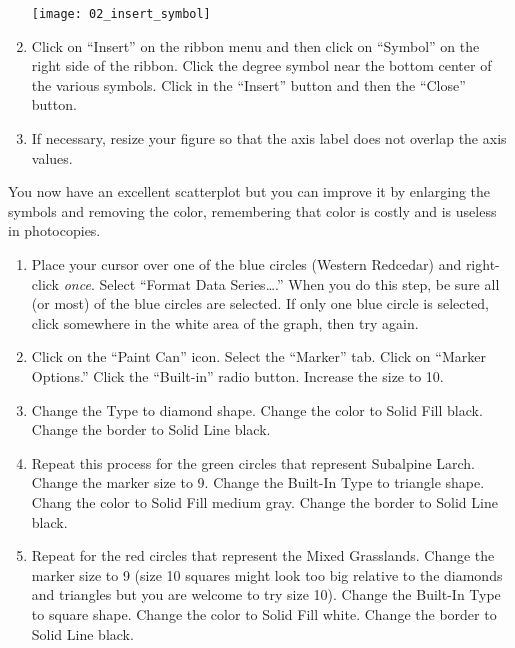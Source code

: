 \documentclass[12pt, hidelinks]{exam}
\begin{document}
\begin{questions}
\begin{enumerate}[resume]
\begin{center}
	\texttt{[image: 02\_insert\_symbol]}
\end{center}

	\item Click on “Insert” on the ribbon menu and then click on “Symbol” on the right side of the ribbon. Click the degree symbol near the bottom center of the various symbols. Click in the “Insert” button and then the “Close” button. 
	
	\item If necessary, resize your figure so that the axis label does not overlap the axis values.
\end{enumerate}
 
You now have an excellent scatterplot but you can improve it by enlarging the symbols and removing the color, remembering that color is costly and is useless in photocopies.

\begin{enumerate}[resume]
	\item Place your cursor over one of the blue circles (Western Redcedar) and right-click \emph{once}. Select “Format Data Series\dots.” When you do this step, be sure all (or most) of the blue circles are selected. If only one blue circle is selected, click somewhere in the white area of the graph, then try again.  

	\item Click on the “Paint Can” icon. Select the “Marker” tab. Click on “Marker Options.” Click the “Built-in” radio button.  Increase the size to 10.
	
	\item Change the Type to diamond shape. Change the color to Solid Fill black. Change the border to Solid Line black.

	\item Repeat this process for the green circles that represent Subalpine Larch. Change the marker size to 9. Change the Built-In Type to triangle shape. Chang the color to Solid Fill medium gray.  Change the border to Solid Line black.

	\item Repeat for the red circles that represent the Mixed Grasslands. Change the marker size to 9 (size 10 squares might look too big relative to the diamonds and triangles but you are welcome to try size 10). Change the Built-In Type to square shape. Change the color to Solid Fill white.  Change the border to Solid Line black.
\end{enumerate}


\end{questions}
\end{document}
